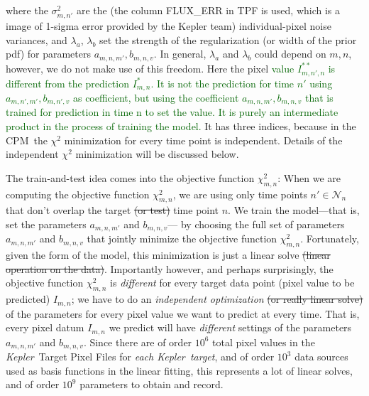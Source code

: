 \documentclass[12pt, preprint]{aastex}
\newcommand{\project}[1]{\textsl{#1}}
\newcommand{\Kepler}{\project{Kepler}}
\newcommand{\name}{CPM}
\newcommand{\set}[1]{\mathcal{#1}}
\newcommand{\revise}[1]{\textcolor{darkgreen}{#1}}
\newcommand{\remove}[1]{\sout{#1}}
\begin{document}
where the $\sigma^2_{m,n'}$ are the (the column FLUX\_ERR in TPF is used, which is a image of 1-sigma error provided by the Kepler team) individual-pixel noise variances, and $\lambda_{a}$, 
  $\lambda_{b}$ set the strength of the regularization (or width of the prior pdf) for parameters $a_{m,n,m'}, b_{m,n,v}$. 
  In general, $\lambda_a$ and $\lambda_b$ could depend on $m,n$, however, we do not make use of this freedom. 
  Here the pixel \revise{value $I^{\ast\ast}_{m,n',n}$ is different from the prediction $I^{\ast}_{m,n}$. It is not the prediction for time $n'$ using $a_{m,n',m'}, b_{m,n',v}$ as coefficient, but using the coefficient $a_{m,n,m'}, b_{m,n,v}$ that is trained for prediction in time n to set the value. It is purely an intermediate product in the process of training the model.} It has three indices, 
  because in the \name\ the $\chi^2$ minimization for every time
  point is independent. Details of the independent $\chi^2$ minimization will be discussed below.

The train-and-test idea comes into the objective function $\chi^2_{m,n}$:
When we are computing the objective function $\chi^2_{m,n}$,
  we are using only time points $n'\in\set{N}_n$ that don't overlap the target \remove{(or test)} time point $n$.
We train the model---that is, set the parameters $a_{m,n,m'}$ and $b_{m,n,v}$---%
  by choosing the full set of parameters $a_{m,n,m'}$ and $b_{m,n,v}$ 
  that jointly minimize the objective function $\chi^2_{m,n}$.
Fortunately, given the form of the model,
  this minimization is just a linear solve \remove{(linear operation on the data)}.
Importantly however, and perhaps surprisingly, the objective function $\chi^2_{m,n}$ is \emph{different}
  for every target data point (pixel value to be predicted) $I_{m,n}$;
  we have to do an \emph{independent optimization} \remove{(or really linear solve)}
  of the parameters for every pixel value we want to predict at every time.
That is, every pixel datum $I_{m,n}$ we predict will have
  \emph{different} settings of the parameters $a_{m,n,m'}$ and $b_{m,n,v}$.
Since there are of order $10^{6}$ total pixel values in the \Kepler\ Target Pixel Files for \emph{each \Kepler\ target},
  and of order $10^{3}$ data sources used as basis functions in the linear fitting,
  this represents a lot of linear solves, and of order $10^{9}$ parameters to obtain and record.
\end{document}
